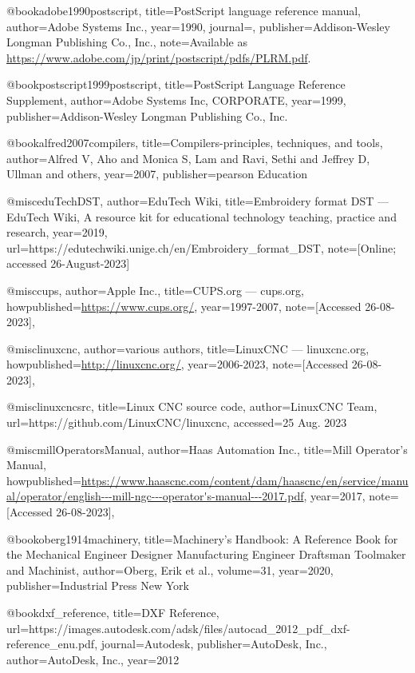 @book{adobe1990postscript,
    title={PostScript{\textregistered} language reference manual},
    author={Adobe Systems Inc.},
    year={1990},
    journal={},
    publisher={Addison-Wesley Longman Publishing Co., Inc.},
    note={Available as \url{https://www.adobe.com/jp/print/postscript/pdfs/PLRM.pdf}.}
}

@book{postscript1999postscript,
    title={PostScript{\textregistered} Language Reference Supplement},
    author={Adobe Systems Inc, CORPORATE},
    year={1999},
    publisher={Addison-Wesley Longman Publishing Co., Inc.}
}

@book{alfred2007compilers,
    title={Compilers-principles, techniques, and tools},
    author={Alfred V, Aho and Monica S, Lam and Ravi, Sethi and Jeffrey D, Ullman and others},
    year={2007},
    publisher={pearson Education}
}

@misc{eduTechDST,
    author={EduTech Wiki},
    title={Embroidery format DST --- EduTech Wiki{,} A resource kit for educational technology teaching, practice and research},
    year={2019},
    url={https://edutechwiki.unige.ch/en/Embroidery_format_DST},
    note={[Online; accessed 26-August-2023]}
}

@misc{cups,
	author={Apple Inc.},
	title={{C}{U}{P}{S}.org --- cups.org},
	howpublished={\url{https://www.cups.org/}},
	year={1997-2007},
	note={[Accessed 26-08-2023]},
}

@misc{linuxcnc,
	author={various authors},
	title={{L}inux{C}{N}{C} --- linuxcnc.org},
	howpublished={\url{http://linuxcnc.org/}},
	year={2006-2023},
	note={[Accessed 26-08-2023]},
}

@misc{linuxcncsrc,
    title={Linux CNC source code},
    author={LinuxCNC Team},
    url={https://github.com/LinuxCNC/linuxcnc},
    accessed={25 Aug. 2023}
}

@misc{millOperatorsManual,
	author={Haas Automation Inc.},
	title={Mill Operator's Manual},
	howpublished={\url{https://www.haascnc.com/content/dam/haascnc/en/service/manual/operator/english---mill-ngc---operator's-manual---2017.pdf}},
	year={2017},
	note={[Accessed 26-08-2023]},
}

@book{oberg1914machinery,
    title={Machinery's Handbook: A Reference Book for the Mechanical Engineer Designer Manufacturing Engineer Draftsman Toolmaker and Machinist},
    author={Oberg, Erik et al.},
    volume={31},
    year={2020},
    publisher={Industrial Press New York}
}

@book{dxf_reference,
    title={DXF Reference},
    url={https://images.autodesk.com/adsk/files/autocad_2012_pdf_dxf-reference_enu.pdf},
    journal={Autodesk},
    publisher={AutoDesk, Inc.},
    author={AutoDesk, Inc.},
    year={2012}
}


